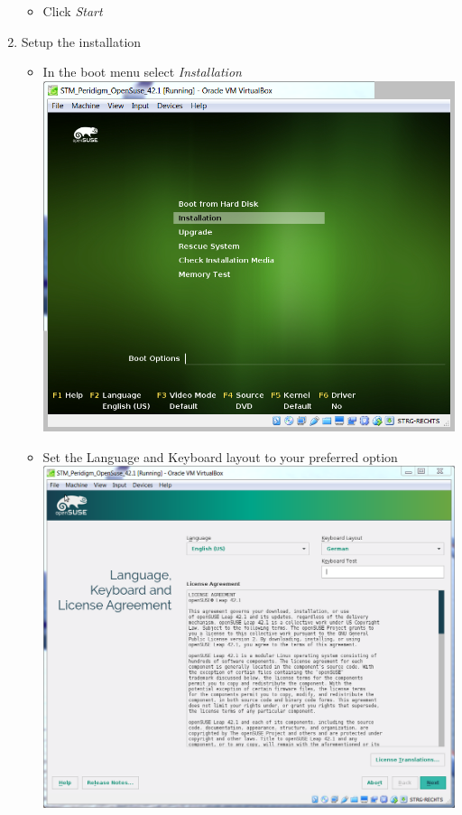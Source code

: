 \begin{enumerate}[noitemsep]
\begin{itemize}
   \item Click \textit{Start}
 \end{itemize}
 \item Setup the installation
 \begin{itemize}
   \item In the \marktool{\opensusename} boot menu select \textit{Installation}\\
   \includegraphics[scale=0.25]{Figures/VirtualBox_VirtualMachine_OperatingSystem_Boot_Installation}
   \item Set the Language and Keyboard layout to your preferred option\\
   \includegraphics[scale=0.25]{Figures/VirtualBox_VirtualMachine_OperatingSystem_Language}

\end{itemize}
\end{enumerate}
